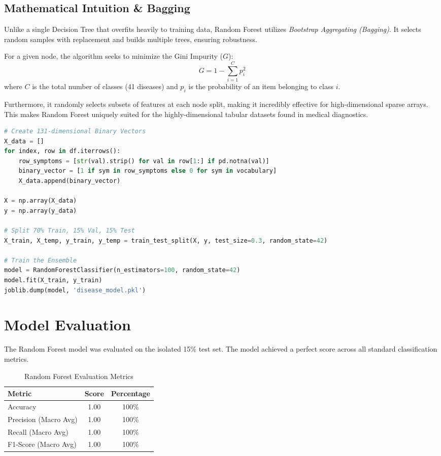 \documentclass[12pt,a4paper]{report}
\begin{document}
\subsection{Mathematical Intuition \& Bagging}
Unlike a single Decision Tree that overfits heavily to training data, Random Forest utilizes \textit{Bootstrap Aggregating (Bagging)}. It selects random samples with replacement and builds multiple trees, ensuring robustness. 

For a given node, the algorithm seeks to minimize the Gini Impurity ($G$):
\[ G = 1 - \sum_{i=1}^{C} p_i^2 \]
where $C$ is the total number of classes (41 diseases) and $p_i$ is the probability of an item belonging to class $i$.

Furthermore, it randomly selects subsets of features at each node split, making it incredibly effective for high-dimensional sparse arrays. This makes Random Forest uniquely suited for the highly-dimensional tabular datasets found in medical diagnostics.

\begin{lstlisting}[language=Python, caption=Data Splitting and Random Forest Training]
# Create 131-dimensional Binary Vectors
X_data = []
for index, row in df.iterrows():
    row_symptoms = [str(val).strip() for val in row[1:] if pd.notna(val)]
    binary_vector = [1 if sym in row_symptoms else 0 for sym in vocabulary]
    X_data.append(binary_vector)

X = np.array(X_data)
y = np.array(y_data)

# Split 70% Train, 15% Val, 15% Test
X_train, X_temp, y_train, y_temp = train_test_split(X, y, test_size=0.3, random_state=42)

# Train the Ensemble
model = RandomForestClassifier(n_estimators=100, random_state=42)
model.fit(X_train, y_train)
joblib.dump(model, 'disease_model.pkl')
\end{lstlisting}

\section{Model Evaluation}
The Random Forest model was evaluated on the isolated 15\% test set. The model achieved a perfect score across all standard classification metrics.

\begin{table}[H]
    \centering
    \caption{Random Forest Evaluation Metrics}
    \vspace{0.3cm}
    \begin{tabular}{|l|c|c|}
        \hline
        \textbf{Metric} & \textbf{Score} & \textbf{Percentage} \\
        \hline
        Accuracy & 1.00 & 100\% \\
        Precision (Macro Avg) & 1.00 & 100\% \\
        Recall (Macro Avg) & 1.00 & 100\% \\
        F1-Score (Macro Avg) & 1.00 & 100\% \\
        \hline
    \end{tabular}
    \label{tab:model_metrics}
\end{table}
\end{document}
